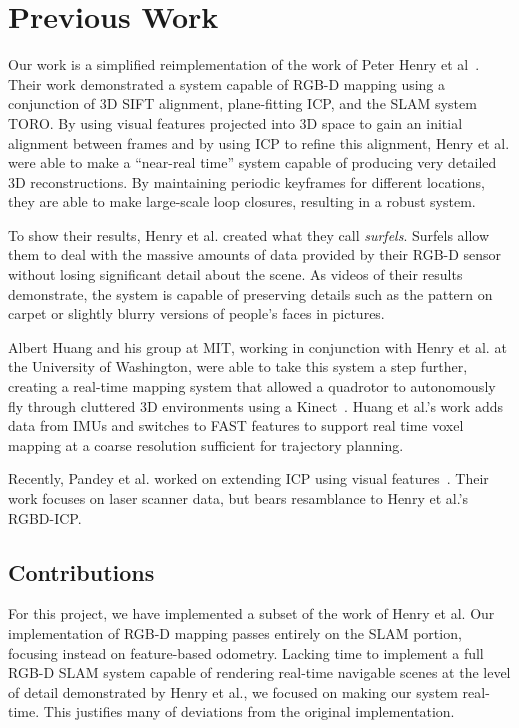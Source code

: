 \documentclass[letterpaper, 10pt, conference]{ieeeconf}
\begin{document}
\section{Previous Work}
Our work is a simplified reimplementation of the work of Peter Henry et
al~\cite{Henry2010RGBd}. Their work demonstrated a system capable of RGB-D
mapping using a conjunction of 3D SIFT alignment, plane-fitting ICP, and the
SLAM system TORO. By using visual features projected into 3D space to gain an
initial alignment between frames and by using ICP to refine this alignment, Henry et al. 
were able to make a ``near-real time'' system capable of
producing very detailed 3D reconstructions. By maintaining periodic keyframes
for different locations, they are able to make large-scale loop closures, resulting in a robust system.

To show their results, Henry et al. created what they call \emph{surfels}.
Surfels allow them to deal with the massive amounts of data provided by their
RGB-D sensor without losing significant detail about the scene. As videos of
their results demonstrate, the system is capable of preserving details such as
the pattern on carpet or slightly blurry versions of people's faces in
pictures.

Albert Huang and his group at MIT, working in conjunction with Henry et al. at
the University of Washington, were able to take this system a step further,
creating a real-time mapping system that allowed a quadrotor to autonomously
fly through cluttered 3D environments using a Kinect~\cite{Huang2011isrr}.
Huang et al.'s work adds data from IMUs and switches to FAST features to
support real time voxel mapping at a coarse resolution sufficient for
trajectory planning.

Recently, Pandey et al. worked on extending ICP using visual features~\cite{silviogicp}.
Their work focuses on laser scanner data, but bears resamblance to Henry et al.'s
RGBD-ICP.

\subsection{Contributions}
For this project, we have implemented a subset of the work of Henry et al.
Our implementation of RGB-D mapping passes entirely on the SLAM portion,
focusing instead on feature-based odometry. Lacking time to implement a
full RGB-D SLAM system capable of rendering real-time navigable scenes at the
level of detail demonstrated by Henry et al., we focused on making our system
real-time. This justifies many of deviations from the original
implementation.
\end{document}
